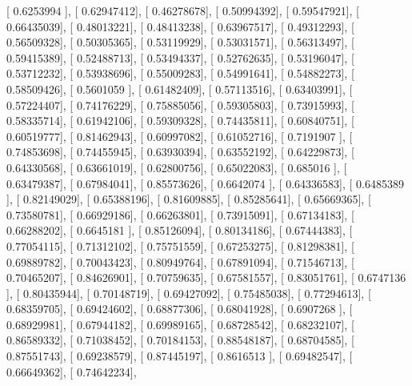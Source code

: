 \documentclass{article}
\begin{document}
       [ 0.6253994 ],
       [ 0.62947412],
       [ 0.46278678],
       [ 0.50994392],
       [ 0.59547921],
       [ 0.66435039],
       [ 0.48013221],
       [ 0.48413238],
       [ 0.63967517],
       [ 0.49312293],
       [ 0.56509328],
       [ 0.50305365],
       [ 0.53119929],
       [ 0.53031571],
       [ 0.56313497],
       [ 0.59415389],
       [ 0.52488713],
       [ 0.53494337],
       [ 0.52762635],
       [ 0.53196047],
       [ 0.53712232],
       [ 0.53938696],
       [ 0.55009283],
       [ 0.54991641],
       [ 0.54882273],
       [ 0.58509426],
       [ 0.5601059 ],
       [ 0.61482409],
       [ 0.57113516],
       [ 0.63403991],
       [ 0.57224407],
       [ 0.74176229],
       [ 0.75885056],
       [ 0.59305803],
       [ 0.73915993],
       [ 0.58335714],
       [ 0.61942106],
       [ 0.59309328],
       [ 0.74435811],
       [ 0.60840751],
       [ 0.60519777],
       [ 0.81462943],
       [ 0.60997082],
       [ 0.61052716],
       [ 0.7191907 ],
       [ 0.74853698],
       [ 0.74455945],
       [ 0.63930394],
       [ 0.63552192],
       [ 0.64229873],
       [ 0.64330568],
       [ 0.63661019],
       [ 0.62800756],
       [ 0.65022083],
       [ 0.685016  ],
       [ 0.63479387],
       [ 0.67984041],
       [ 0.85573626],
       [ 0.6642074 ],
       [ 0.64336583],
       [ 0.6485389 ],
       [ 0.82149029],
       [ 0.65388196],
       [ 0.81609885],
       [ 0.85285641],
       [ 0.65669365],
       [ 0.73580781],
       [ 0.66929186],
       [ 0.66263801],
       [ 0.73915091],
       [ 0.67134183],
       [ 0.66288202],
       [ 0.6645181 ],
       [ 0.85126094],
       [ 0.80134186],
       [ 0.67444383],
       [ 0.77054115],
       [ 0.71312102],
       [ 0.75751559],
       [ 0.67253275],
       [ 0.81298381],
       [ 0.69889782],
       [ 0.70043423],
       [ 0.80949764],
       [ 0.67891094],
       [ 0.71546713],
       [ 0.70465207],
       [ 0.84626901],
       [ 0.70759635],
       [ 0.67581557],
       [ 0.83051761],
       [ 0.6747136 ],
       [ 0.80435944],
       [ 0.70148719],
       [ 0.69427092],
       [ 0.75485038],
       [ 0.77294613],
       [ 0.68359705],
       [ 0.69424602],
       [ 0.68877306],
       [ 0.68041928],
       [ 0.6907268 ],
       [ 0.68929981],
       [ 0.67944182],
       [ 0.69989165],
       [ 0.68728542],
       [ 0.68232107],
       [ 0.86589332],
       [ 0.71038452],
       [ 0.70184153],
       [ 0.88548187],
       [ 0.68704585],
       [ 0.87551743],
       [ 0.69238579],
       [ 0.87445197],
       [ 0.8616513 ],
       [ 0.69482547],
       [ 0.66649362],
       [ 0.74642234],
\end{document}
